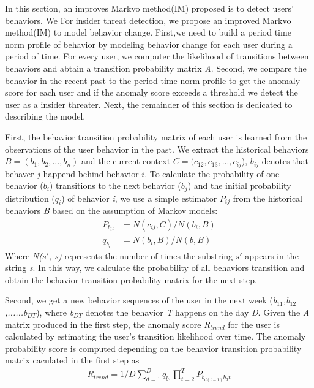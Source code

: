 \documentclass[conference]{IEEEtran}
\begin{document}
\iffalse
In this section, an improves Markvo method(IM) proposed is to detect users' behaviors. 
We 
For insider threat detection, we propose an improved Markvo method(IM) to model behavior change. First,we need to build a period time norm profile of behavior by modeling behavior change for each user during a period of time. For every user, we computer the likelihood of transitions between behaviors and abtain a transition probability matrix \emph{A}.
Second, we compare the behavior in the recent past to
the period-time norm profile to get the anomaly score for each user and if the anomaly score exceeds a threshold we detect the user as a insider threater. 
Next, the remainder of this section is dedicated to describing the model.

First, the behavior transition probability matrix of each user is learned from the observations of the user behavior in the past. 
We extract the historical behaviors 
$B=(b_1, b_2, ..., b_n)$ and the current context $C = (c_{12},c_{13},..., c_{ij}$), $b_{ij}$ denotes that behaver $j$ happend behind behavior $i$. 
To calculate the probability of one behavior ($b_i$) transitions to the next behavior ($b_j$) and the initial probability distribution (\emph{$q_i$}) of behavior \emph{i}, 
we use a simple estimator $P_{ij}$ from the historical behaviors \emph{B} based on the assumption of Markov models\cite{b47}:
\begin{align}
P_{b_{ij}}&=N(c_{ij},C)/N(b_i,B)\\
q_{b_i}&=N({b_i},B)/N(b,B)
\end{align}
Where \emph{N($s\prime$, s)} represents the number of times the substring \emph{$s\prime$} appears in the string \emph{s}. In this way, we calculate the probability of all behaviors transition and obtain the behavior transition probability matrix for the next step.

Second, we get a new behavior sequences of the user in the next week (\emph{b$_{11}$,b$_{12}$,......b$_{DT}$}), where \emph{b$_{DT}$} denotes the behavior \emph{T} happens on the day \emph{D}. Given the \emph{A} matrix produced in the first step, the anomaly score \emph{R$_{trend}$} for the user is calculated by estimating the user’s transition likelihood over time. The anomaly probability score is computed depending on the behavior transition probability matrix caculated in the first step as
\begin{align}
R_{trend}=1/D\sum_{d=1}^D {q_{b_1}\prod_{t=2}^T P_{b_{d(t-1)}b_dt}}
\end{align}
\end{document}
